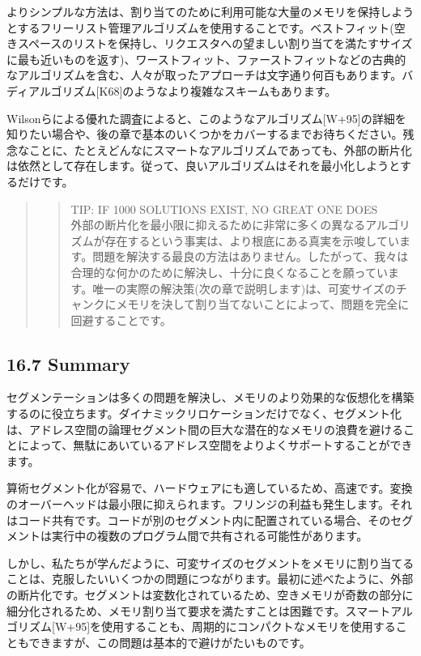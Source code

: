 よりシンプルな方法は、割り当てのために利用可能な大量のメモリを保持しようとするフリーリスト管理アルゴリズムを使用することです。ベストフィット(空きスペースのリストを保持し、リクエスタへの望ましい割り当てを満たすサイズに最も近いものを返す)、ワーストフィット、ファーストフィットなどの古典的なアルゴリズムを含む、人々が取ったアプローチは文字通り何百もあります。バディアルゴリズム{[}K68{]}のようなより複雑なスキームもあります。

Wilsonらによる優れた調査によると、このようなアルゴリズム{[}W+95{]}の詳細を知りたい場合や、後の章で基本のいくつかをカバーするまでお待ちください。残念なことに、たとえどんなにスマートなアルゴリズムであっても、外部の断片化は依然として存在します。従って、良いアルゴリズムはそれを最小化しようとするだけです。

\begin{quote}
\begin{quote}
TIP: IF 1000 SOLUTIONS EXIST, NO GREAT ONE DOES\\
外部の断片化を最小限に抑えるために非常に多くの異なるアルゴリズムが存在するという事実は、より根底にある真実を示唆しています。問題を解決する最良の方法はありません。したがって、我々は合理的な何かのために解決し、十分に良くなることを願っています。唯一の実際の解決策(次の章で説明します)は、可変サイズのチャンクにメモリを決して割り当てないことによって、問題を完全に回避することです。
\end{quote}
\end{quote}

\hypertarget{summary-9}{%
\subsection*{16.7 Summary}\label{summary-9}}

セグメンテーションは多くの問題を解決し、メモリのより効果的な仮想化を構築するのに役立ちます。ダイナミックリロケーションだけでなく、セグメント化は、アドレス空間の論理セグメント間の巨大な潜在的なメモリの浪費を避けることによって、無駄にあいているアドレス空間をよりよくサポートすることができます。

算術セグメント化が容易で、ハードウェアにも適しているため、高速です。変換のオーバーヘッドは最小限に抑えられます。フリンジの利益も発生します。それはコード共有です。コードが別のセグメント内に配置されている場合、そのセグメントは実行中の複数のプログラム間で共有される可能性があります。

しかし、私たちが学んだように、可変サイズのセグメントをメモリに割り当てることは、克服したいいくつかの問題につながります。最初に述べたように、外部の断片化です。セグメントは変数化されているため、空きメモリが奇数の部分に細分化されるため、メモリ割り当て要求を満たすことは困難です。スマートアルゴリズム{[}W+95{]}を使用することも、周期的にコンパクトなメモリを使用することもできますが、この問題は基本的で避けがたいものです。

